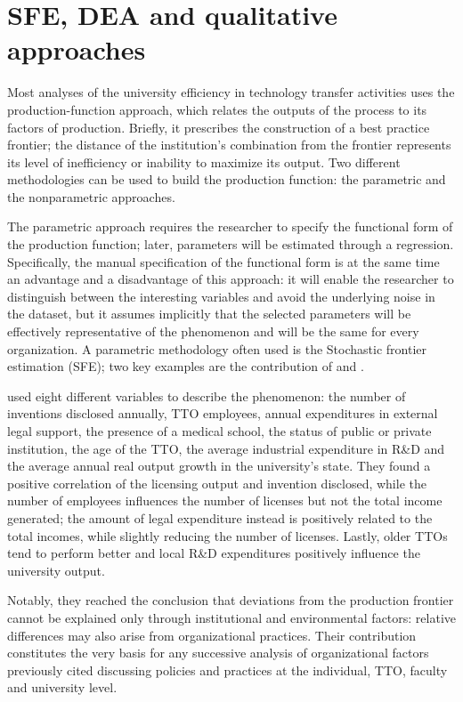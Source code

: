 \section{SFE, DEA and qualitative approaches}

Most analyses of the university efficiency in technology transfer activities uses the production-function approach, which relates the outputs of the process to its factors of production. Briefly, it prescribes the construction of a best practice frontier; the distance of the institution's combination from the frontier represents its level of inefficiency or inability to maximize its output. Two different methodologies can be used to build the production function: the parametric and the nonparametric approaches.

The parametric approach requires the researcher to specify the functional form of the production function; later, parameters will be estimated through a regression. Specifically, the manual specification of the functional form is at the same time an advantage and a disadvantage of this approach: it will enable the researcher to distinguish between the interesting variables and avoid the underlying noise in the dataset, but it assumes implicitly that the selected parameters will be effectively representative of the phenomenon and will be the same for every organization. A parametric methodology often used is the Stochastic frontier estimation (SFE); two key examples are the contribution of \citet{Siegel2003a} and \citet{Link2005}.

\citet{Siegel2003a} used eight different variables to describe the phenomenon: the number of inventions disclosed annually, TTO employees, annual expenditures in external legal support, the presence of a medical school, the status of public or private institution, the age of the TTO, the average industrial expenditure in R\&D and the average annual real output growth in the university's state. They found a positive correlation of the licensing output and invention disclosed, while the number of employees influences the number of licenses but not the total income generated; the amount of legal expenditure instead is positively related to the total incomes, while slightly reducing the number of licenses. Lastly, older TTOs tend to perform better and local R\&D expenditures positively influence the university output. 

Notably, they reached the conclusion that deviations from the production frontier cannot be explained only through institutional and environmental factors: relative differences may also arise from organizational practices. Their contribution constitutes the very basis for any successive analysis of organizational factors previously cited discussing policies and practices at the individual, TTO, faculty and university level. 

